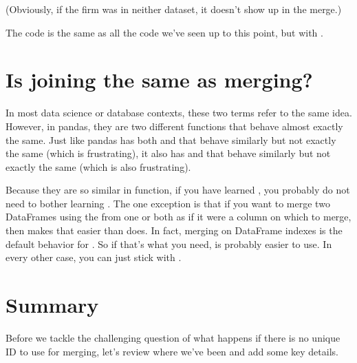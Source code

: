 \documentclass[letterpaper,10pt,english]{jupyterBook}
\begin{document}
\sphinxAtStartPar
(Obviously, if the firm was in neither dataset, it doesn’t show up in the merge.)

\sphinxAtStartPar
The code is the same as all the code we’ve seen up to this point, but with .

\begin{sphinxVerbatim}[commandchars=\\\{\}]
       
\end{sphinxVerbatim}


\section{Is joining the same as merging?}
\label{\detokenize{chapter-12-concat-and-merge:is-joining-the-same-as-merging}}
\sphinxAtStartPar
In most data science or database contexts, these two terms refer to the same idea.  However, in pandas, they are two different functions that behave almost exactly the same.  Just like pandas has both  and  that behave similarly but not exactly the same (which is frustrating), it also has  and  that behave similarly but not exactly the same (which is also frustrating).

\sphinxAtStartPar
Because they are so similar in function, if you have learned , you probably do not need to bother learning .  The one exception is that if you want to merge two DataFrames using the  from one or both as if it were a column on which to merge, then  makes that easier than  does.  In fact, merging on DataFrame indexes is the default behavior for .  So if that’s what you need,  is probably easier to use.  In every other case, you can just stick with .


\section{Summary}
\label{\detokenize{chapter-12-concat-and-merge:summary}}
\sphinxAtStartPar
Before we tackle the challenging question of what happens if there is no unique ID to use for merging, let’s review where we’ve been and add some key details.
\end{document}
